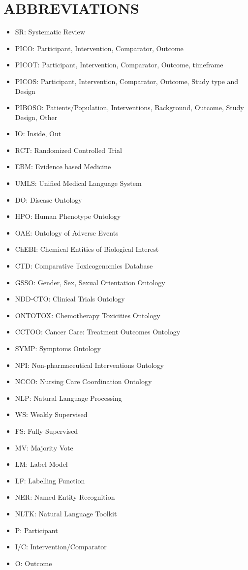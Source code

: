 \documentclass[10.7pt,]{article}
\begin{document}
\section{ABBREVIATIONS}\label{abb}
%
\begin{itemize}
    \item SR: Systematic Review 
    \item PICO: Participant, Intervention, Comparator, Outcome
    \item PICOT: Participant, Intervention, Comparator, Outcome, timeframe
    \item PICOS: Participant, Intervention, Comparator, Outcome, Study type and Design
    \item PIBOSO: Patients/Population, Interventions, Background, Outcome, Study Design, Other
    \item IO: Inside, Out
    \item RCT: Randomized Controlled Trial
    \item EBM: Evidence based Medicine
    \item UMLS: Unified Medical Language System
    \item DO: Disease Ontology
    \item HPO: Human Phenotype Ontology
    \item OAE: Ontology of Adverse Events
    \item ChEBI: Chemical Entities of Biological Interest
    \item CTD: Comparative Toxicogenomics Database
    \item GSSO: Gender, Sex, Sexual Orientation Ontology
    \item NDD-CTO: Clinical Trials Ontology
    \item ONTOTOX: Chemotherapy Toxicities Ontology
    \item CCTOO: Cancer Care: Treatment Outcomes Ontology
    \item SYMP: Symptoms Ontology
    \item NPI: Non-pharmaceutical Interventions Ontology
    \item NCCO: Nursing Care Coordination Ontology
    \item NLP: Natural Language Processing
    \item WS: Weakly Supervised
    \item FS: Fully Supervised
    \item MV: Majority Vote
    \item LM: Label Model
    \item LF: Labelling Function
    \item NER: Named Entity Recognition
    \item NLTK: Natural Language Toolkit
    \item P: Participant
    \item I/C: Intervention/Comparator
    \item O: Outcome
\end{itemize}
%
%
%
\end{document}
